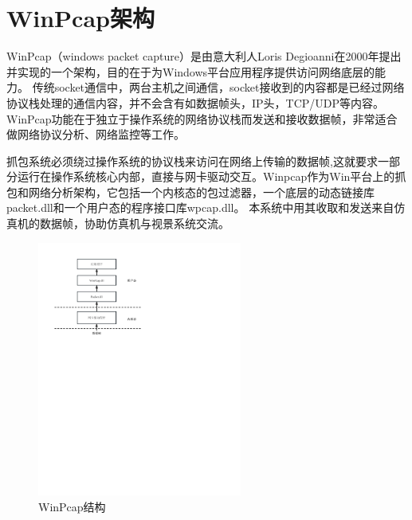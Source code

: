 \section{WinPcap架构}
WinPcap（windows packet capture）是由意大利人Loris Degioanni在2000年提出并实现的一个架构，目的在于为Windows平台应用程序提供访问网络底层的能力\cite{winpcap1}。
传统socket通信中，两台主机之间通信，socket接收到的内容都是已经过网络协议栈处理的通信内容，并不会含有如数据帧头，IP头，TCP/UDP等内容。WinPcap功能在于独立于操作系统的网络协议栈而发送和接收数据帧，非常适合做网络协议分析、网络监控等工作\cite{winpcap2}。
\par
抓包系统必须绕过操作系统的协议栈来访问在网络上传输的数据帧,这就要求一部分运行在操作系统核心内部，直接与网卡驱动交互。Winpcap作为Win平台上的抓包和网络分析架构，它包括一个内核态的包过滤器，一个底层的动态链接库packet.dll和一个用户态的程序接口库wpcap.dll\cite{winpcap3}。
本系统中用其收取和发送来自仿真机的数据帧，协助仿真机与视景系统交流。
\begin{figure}[h!]
    \begin{center}
        \includegraphics[width=0.6\textwidth]{pictures/winpcap.pdf}
        \caption{WinPcap结构}
        \label{wincapstruc}
    \end{center}
\end{figure}
